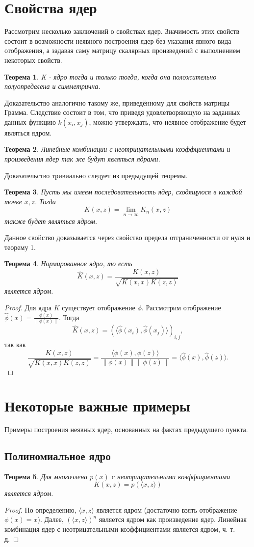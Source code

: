 \documentclass[twoside,twocolumn]{article}
\theoremstyle{plain}
\newtheorem{theorem}{Теорема}
\theoremstyle{definition}
\begin{document}
\section{Свойства ядер}
Рассмотрим несколько заключений о свойствах ядер. Значимость этих свойств состоит в возможности неявного построения ядер без указания явного вида отображения, а задавая саму матрицу скалярных произведений с выполнением некоторых свойств.
\begin{theorem}
K - ядро тогда и только тогда, когда она положительно полуопределена и симметрична.
\end{theorem}
Доказательство аналогично такому же, приведённому для свойств матрицы Грамма. Следствие состоит в том, что приведя удовлетворяющую на заданных данных функцию $k(x_i, x_j)$, можно утверждать, что неявное отображение будет являться ядром.
\begin{theorem}
Линейные комбинации с неотрицательными коэффциентами и произведения ядер так же будут являться ядрами.
\end{theorem}
Доказательство тривиально следует из предыдущей теоремы.
\begin{theorem}
Пусть мы имеем последовательность ядер, сходящуюся в каждой точке $x, z$. Тогда 
\[K(x, z) = \lim_{n \xrightarrow{} \infty} K_n(x, z)\]
также будет являться ядром.
\end{theorem}
Данное свойство доказывается через свойство предела отграниченности от нуля и теорему 1.

\begin{theorem}
Нормированное ядро, то есть
\[\hat{K}(x, z) = \frac{K(x,z)}{\sqrt{K(x, x)K(z, z)}}\]
является ядром.
\end{theorem}
\begin{proof}
Для ядра $K$ существует отображение $\phi$. Рассмотрим отображение $\hat{\phi}(x) = \frac{\phi(x)}{\|\phi(x)\|}$. Тогда
\[\hat{K}(x, z) = (\langle \hat{\phi}(x_i), \hat{\phi}(x_j)\rangle)_{i, j},\] так как
\[\frac{K(x,z)}{\sqrt{K(x, x)K(z, z)}} = \frac{\langle \phi(x), \phi(z) \rangle}{\|\phi(x)\|\|\phi(z)\|} = \langle \hat{\phi}(x), \hat{\phi}(z)\rangle.\]
\end{proof}

\section{Некоторые важные примеры}
Примеры построения неявных ядер, основанных на фактах предыдущего пункта.
\subsection{Полиномиальное ядро}
\begin{theorem}
Для многочлена $p(x)$ с неотрицательными коэффициентами \[K(x, z) = p(\langle x, z\rangle)\] является ядром.
\end{theorem}
\begin{proof}
По определению, $\langle x, z\rangle$ является ядром (достаточно взять отображение $\phi(x) = x$). Далее, $(\langle x, z\rangle)^n$ является ядром как произведение ядер. Линейная комбинация ядер с неотрицательными коэффициентами является ядром, ч. т. д.
\end{proof} 
\end{document}
